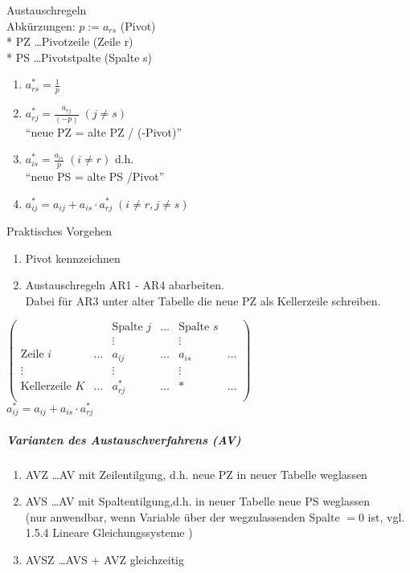 \documentclass[a4paper]{scrartcl}
\begin{document}
Austauschregeln\\
Abkürzungen: $p:= a_{rs}$ (Pivot)\\*
PZ \dots Pivotzeile (Zeile r)\\*
PS \dots Pivotstpalte (Spalte s)
\begin{enumerate}
\item \label{AR1} $a_{rs}^* = \frac{1}{p}$
\item \label{AR2} $a_{rj}^* = \frac{a_{rj}}{(-p)} \; (j \neq s)$\\
"`neue PZ = alte PZ / (-Pivot)"'
\item \label{AR3} $a_{is}^* = \frac{a_{is}}{p}\; (i \neq r)$ d.h.\\
"`neue PS = alte PS /Pivot"'
\item \label{AR4} $a_{ij}^* = a_{ij} + a_{is} \cdot a_{rj}^* \; (i \neq r, j \neq s)$
\end{enumerate}

Praktisches Vorgehen
\begin{enumerate}
\item Pivot kennzeichnen
\item Austauschregeln AR1 - AR4 abarbeiten.\\
Dabei für AR3 unter alter Tabelle die neue PZ als Kellerzeile schreiben.
\end{enumerate}

$\begin{pmatrix}
 & & \text{Spalte } j & \dots & \text{Spalte } s & \\
 & & \vdots & & \vdots \\
\text{Zeile } i & \dots & a_{ij} & \dots & a_{is} & \dots \\
\vdots & & \vdots & &\vdots \\
\text{Kellerzeile } K & \dots & a_{rj}^* & \dots & * & \dots \\
\end{pmatrix}$\\
$a_{ij}^* = a_{ij} + a_{is} \cdot a_{rj}^*$

\subparagraph{Varianten des Austauschverfahrens (AV)}
\begin{enumerate}
\item AVZ \dots AV mit Zeilentilgung, d.h. neue PZ in neuer Tabelle weglassen
\item AVS \dots AV mit Spaltentilgung,d.h. in neuer Tabelle neue PS weglassen\\
(nur anwendbar, wenn Variable über der wegzulassenden Spalte $=0$ ist, vgl. 1.5.4 Lineare Gleichungssysteme )
\item AVSZ \dots AVS + AVZ gleichzeitig
\end{enumerate}
\end{document}

